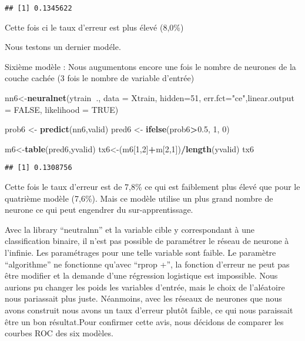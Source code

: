 \documentclass[
]{article}
\newenvironment{Shaded}{\begin{snugshade}}{\end{snugshade}}
\newcommand{\DataTypeTok}[1]{\textcolor[rgb]{0.13,0.29,0.53}{#1}}
\newcommand{\DecValTok}[1]{\textcolor[rgb]{0.00,0.00,0.81}{#1}}
\newcommand{\FloatTok}[1]{\textcolor[rgb]{0.00,0.00,0.81}{#1}}
\newcommand{\KeywordTok}[1]{\textcolor[rgb]{0.13,0.29,0.53}{\textbf{#1}}}
\newcommand{\NormalTok}[1]{#1}
\newcommand{\OperatorTok}[1]{\textcolor[rgb]{0.81,0.36,0.00}{\textbf{#1}}}
\newcommand{\OtherTok}[1]{\textcolor[rgb]{0.56,0.35,0.01}{#1}}
\newcommand{\StringTok}[1]{\textcolor[rgb]{0.31,0.60,0.02}{#1}}
\begin{document}
\begin{verbatim}
## [1] 0.1345622
\end{verbatim}

Cette fois ci le taux d'erreur est plus élevé (8,0\%)

Nous testons un dernier modéle.

Sixième modèle : Nous augumentons encore une fois le nombre de neurones
de la couche cachée (3 fois le nombre de variable d'entrée)

\begin{Shaded}
\begin{Highlighting}[]
\NormalTok{nn6<-}\KeywordTok{neuralnet}\NormalTok{(ytrain}\OperatorTok{~}\NormalTok{., }\DataTypeTok{data =}\NormalTok{ Xtrain, }\DataTypeTok{hidden=}\DecValTok{51}\NormalTok{, }\DataTypeTok{err.fct=}\StringTok{"ce"}\NormalTok{,}\DataTypeTok{linear.output =} \OtherTok{FALSE}\NormalTok{, }\DataTypeTok{likelihood =} \OtherTok{TRUE}\NormalTok{)}

\NormalTok{prob6 <-}\StringTok{ }\KeywordTok{predict}\NormalTok{(nn6,valid)}
\NormalTok{pred6 <-}\StringTok{ }\KeywordTok{ifelse}\NormalTok{(prob6}\OperatorTok{>}\FloatTok{0.5}\NormalTok{, }\DecValTok{1}\NormalTok{, }\DecValTok{0}\NormalTok{)}

\NormalTok{m6<-}\KeywordTok{table}\NormalTok{(pred6,yvalid)}
\NormalTok{tx6<-(m6[}\DecValTok{1}\NormalTok{,}\DecValTok{2}\NormalTok{]}\OperatorTok{+}\NormalTok{m[}\DecValTok{2}\NormalTok{,}\DecValTok{1}\NormalTok{])}\OperatorTok{/}\KeywordTok{length}\NormalTok{(yvalid)}
\NormalTok{tx6}
\end{Highlighting}
\end{Shaded}

\begin{verbatim}
## [1] 0.1308756
\end{verbatim}

Cette fois le taux d'erreur est de 7,8\% ce qui est faiblement plus
élevé que pour le quatrième modèle (7,6\%). Mais ce modèle utilise un
plus grand nombre de neurone ce qui peut engendrer du sur-apprentissage.

Avec la library ``neutralnn'' et la variable cible y correspondant à une
classification binaire, il n'est pas possible de paramétrer le réseau de
neurone à l'infinie. Les paramétrages pour une telle variable sont
faible. Le paramètre ``algorithme'' ne fonctionne qu'avec ``rprop +'',
la fonction d'erreur ne peut pas être modifier et la demande d'une
régression logistique est impossible. Nous aurions pu changer les poids
les variables d'entrée, mais le choix de l'aléatoire nous pariassait
plus juste. Néanmoins, avec les réseaux de neurones que nous avons
construit nous avons un taux d'erreur plutôt faible, ce qui nous
paraissait être un bon résultat.Pour confirmer cette avis, nous décidons
de comparer les courbes ROC des six modèles.
\end{document}
